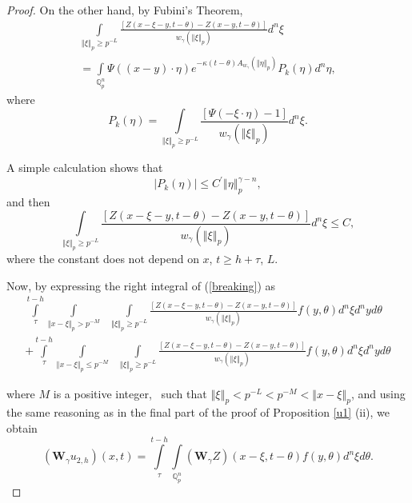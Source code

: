 \documentclass{amsart}\usepackage{amsfonts}
\theoremstyle{plain}
\numberwithin{equation}{section}
\begin{document}
\begin{proof}
On the other hand, by Fubini's Theorem,\begin{multline*}{\displaystyle\int\limits_{\left\Vert \xi\right\Vert _{p}\geq p^{-L}}}
\frac{\left[  Z(x-\xi-y,t-\theta)-Z(x-y,t-\theta)\right]  }{w_{\gamma
}(\left\Vert \xi\right\Vert _{p})}d^{n}\xi\\
=\underset{\mathbb{Q}_{p}^{n}}{\int}\Psi((x-y)\cdot\eta)e^{-\kappa
(t-\theta)A_{w_{\gamma}}(\left\Vert \eta\right\Vert _{p})}P_{k}(\eta)d^{n}\eta,
\end{multline*}
where\[
P_{k}(\eta)={\displaystyle\int\limits_{\left\Vert \xi\right\Vert _{p}\geq p^{-L}}}
\frac{\left[  \Psi(-\xi\cdot\eta)-1\right]  }{w_{\gamma}(\left\Vert
\xi\right\Vert _{p})}d^{n}\xi.
\]


A simple calculation shows that\[
\left\vert P_{k}(\eta)\right\vert \leq C^{\prime}\left\Vert \eta\right\Vert
_{p}^{\gamma-n},
\]
and then\[{\displaystyle\int\limits_{\left\Vert \xi\right\Vert _{p}\geq p^{-L}}}
\frac{\left[  Z(x-\xi-y,t-\theta)-Z(x-y,t-\theta)\right]  }{w_{\gamma
}(\left\Vert \xi\right\Vert _{p})}d^{n}\xi\leq C,
\]
where the constant does not depend on $x$, $t\geq h+\tau$, $L$.

Now, by expressing the right integral of (\ref{breaking}) as\begin{multline}{\displaystyle\int\limits_{\tau}^{t-h}}
\underset{\left\Vert x-\xi\right\Vert _{p}>p^{-M}}{\int}\text{ }{\displaystyle\int\limits_{\left\Vert \xi\right\Vert _{p}\geq p^{-L}}}
\frac{\left[  Z(x-\xi-y,t-\theta)-Z(x-y,t-\theta)\right]  }{w_{\gamma
}(\left\Vert \xi\right\Vert _{p})}f(y,\theta)d^{n}\xi d^{n}yd\theta
\label{Wu2h2}\\
+{\displaystyle\int\limits_{\tau}^{t-h}}
\underset{\left\Vert x-\xi\right\Vert _{p}\leq p^{-M}}{\int}\text{ }{\displaystyle\int\limits_{\left\Vert \xi\right\Vert _{p}\geq p^{-L}}}
\frac{\left[  Z(x-\xi-y,t-\theta)-Z(x-y,t-\theta)\right]  }{w_{\gamma
}(\left\Vert \xi\right\Vert _{p})}f(y,\theta)d^{n}\xi d^{n}yd\theta\nonumber
\end{multline}


where $M$ is a positive integer, \ such that $\left\Vert \xi\right\Vert
_{p}<p^{-L}<p^{-M}<\left\Vert x-\xi\right\Vert _{p}$, and using the same
reasoning as in the final part of the proof of Proposition \ref{u1} (ii), we
obtain
\begin{equation}
(\boldsymbol{W}_{\gamma}u_{2,h})(x,t)={\displaystyle\int\limits_{\tau}^{t-h}}
\underset{\mathbb{Q}_{p}^{n}}{\int}(\boldsymbol{W}_{\gamma}Z)(x-\xi
,t-\theta)f(y,\theta)d^{n}\xi d\theta. \label{Wgamau2h}\end{equation}



\end{proof}
\end{document}
